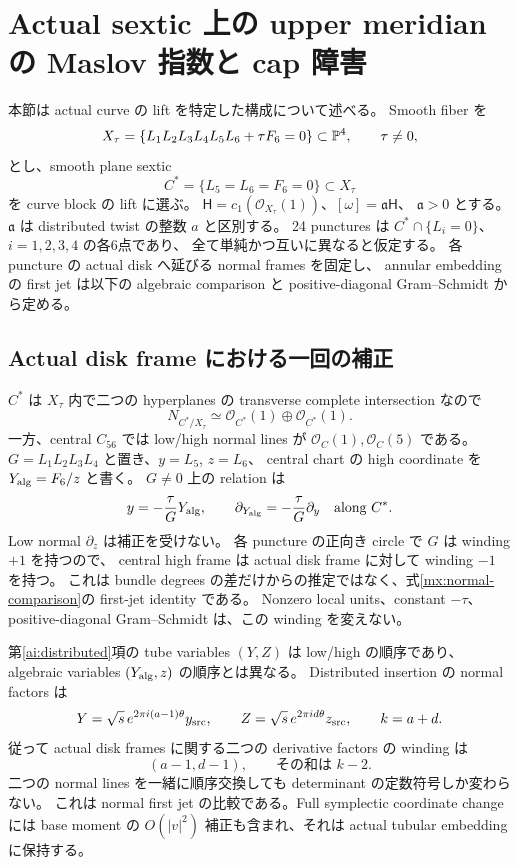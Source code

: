 \section{Actual sextic 上の upper meridian の Maslov 指数と cap 障害}
\label{mx:section}

本節は actual curve の lift を特定した構成について述べる。
Smooth fiber を
\[
 X_\tau=\{L_1L_2L_3L_4L_5L_6+\tau F_6=0\}\subset\mathbb P^4,
 \qquad \tau\ne0,
\]
とし、smooth plane sextic
\[
 C^*=\{L_5=L_6=F_6=0\}\subset X_\tau
\]
を curve block の lift に選ぶ。
$\mathsf H=c_1(\mathcal O_{X_\tau}(1))$、$[\omega]=\mathfrak a\mathsf H$、
$\mathfrak a>0$ とする。$\mathfrak a$ は distributed twist の整数 $a$ と区別する。
24 punctures は $C^*\cap\{L_i=0\}$、$i=1,2,3,4$ の各6点であり、
全て単純かつ互いに異なると仮定する。
各 puncture の actual disk へ延びる normal frames を固定し、
annular embedding の first jet は以下の algebraic comparison と
positive-diagonal Gram--Schmidt から定める。

\subsection{Actual disk frame における一回の補正}

$C^*$ は $X_\tau$ 内で二つの hyperplanes の transverse complete intersection なので
\[
 N_{C^*/X_\tau}\simeq\mathcal O_{C^*}(1)\oplus\mathcal O_{C^*}(1).
\]
一方、central $C_{56}$ では low/high normal lines が
$\mathcal O_C(1),\mathcal O_C(5)$ である。
$G=L_1L_2L_3L_4$ と置き、$y=L_5$, $z=L_6$、
central chart の high coordinate を $Y_{\rm alg}=F_6/z$ と書く。
$G\ne0$ 上の relation は
\begin{equation}\label{mx:normal-comparison}
 y=-\frac{\tau}{G}Y_{\rm alg},\qquad
 \partial_{Y_{\rm alg}}=-\frac{\tau}{G}\partial_y
 \quad\text{along }C^*.
\end{equation}
Low normal $\partial_z$ は補正を受けない。
各 puncture の正向き circle で $G$ は winding $+1$ を持つので、
central high frame は actual disk frame に対して winding $-1$ を持つ。
これは bundle degrees の差だけからの推定ではなく、式\eqref{mx:normal-comparison}の first-jet identity である。
Nonzero local units、constant $-\tau$、positive-diagonal Gram--Schmidt は、この winding を変えない。

第\ref{ai:distributed}項の tube variables $(Y,Z)$ は low/high の順序であり、
algebraic variables $(Y_{\rm alg},z)$ の順序とは異なる。
Distributed insertion の normal factors は
\[
 Y=\sqrt s\,e^{2\pi i(a-1)\theta}y_{\rm src},\qquad
 Z=\sqrt s\,e^{2\pi id\theta}z_{\rm src},\qquad k=a+d.
\]
従って actual disk frames に関する二つの derivative factors の winding は
\begin{equation}\label{mx:normal-degrees}
 (a-1,d-1),\qquad \text{その和は }k-2.
\end{equation}
二つの normal lines を一緒に順序交換しても determinant の定数符号しか変わらない。
これは normal first jet の比較である。Full symplectic coordinate change には
base moment の $O(|v|^2)$ 補正も含まれ、それは actual tubular embedding に保持する。

